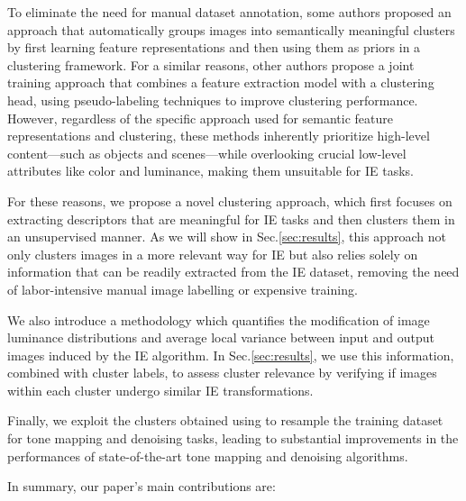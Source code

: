 \documentclass[12pt]{spieman}  %
\begin{document}
\begin{spacing}{2}
\begin{linenumbers}
{To eliminate the need for manual dataset annotation, some authors} \cite{VanGansbeke2020, caron2021unsupervisedlearningvisualfeatures}  {proposed an approach that automatically groups images into semantically meaningful clusters by first learning feature representations and then using them as priors in a clustering framework.  For a similar reasons, other authors} \cite{Niu_2022} { propose a joint training approach that combines a feature extraction model with a clustering head, using pseudo-labeling techniques to improve clustering performance. However, regardless of the specific approach used for semantic feature representations and clustering, these methods inherently prioritize high-level content—such as objects and scenes—while overlooking crucial low-level attributes like color and luminance, making them unsuitable for IE tasks.}



For these reasons, we propose a novel  clustering approach,  \clustname  which first focuses on extracting descriptors that are meaningful for IE tasks and then clusters them in an unsupervised manner. As we will show in Sec.\ref{sec:results}, this approach not only clusters images in a more relevant way for IE but also relies solely on information that can be readily extracted from the IE dataset, removing the need of labor-intensive  manual image labelling or expensive training.


We also introduce a  methodology which quantifies the modification of image luminance distributions and average local variance between  input and output images induced by the IE algorithm. In Sec.\ref{sec:results}, we use this information, combined with cluster labels,  to assess cluster relevance by verifying if images within each cluster undergo similar IE transformations.
  

Finally, we exploit the clusters obtained using \clustname to resample the training dataset for tone mapping and denoising tasks, leading to substantial improvements in the performances of state-of-the-art tone mapping and denoising algorithms. 


\color{black}
In summary, our paper's main contributions are:
\begin{itemize}


\end{itemize}
\end{linenumbers}
\end{spacing}
\end{document}
